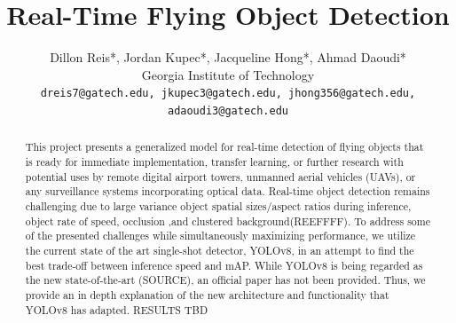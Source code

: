 \documentclass[10pt,twocolumn,letterpaper]{article}
\begin{document}
\title{Real-Time Flying Object Detection}

\author{Dillon Reis*, Jordan Kupec*, Jacqueline Hong*, Ahmad Daoudi*\\
Georgia Institute of Technology\\
{\tt\small dreis7@gatech.edu, jkupec3@gatech.edu, jhong356@gatech.edu, adaoudi3@gatech.edu}
}

\maketitle

\begin{abstract}
   This project presents a generalized model for real-time detection of flying objects that is ready for immediate implementation, transfer learning, or further research with potential uses by remote digital airport towers, unmanned aerial vehicles (UAVs), or any surveillance systems incorporating optical data. Real-time object detection remains challenging due to large variance object spatial sizes/aspect ratios during inference, object rate of speed, occlusion ,and clustered background(REEFFFF). To address some of the presented challenges while simultaneously maximizing performance, we utilize the current state of the art single-shot detector, YOLOv8, in an attempt to find the best trade-off between inference speed and mAP. While YOLOv8 is being regarded as the new state-of-the-art (SOURCE), an official paper has not been provided. Thus, we provide an in depth explanation of the new architecture and functionality that YOLOv8 has adapted. RESULTS TBD
\end{abstract}

\end{document}
